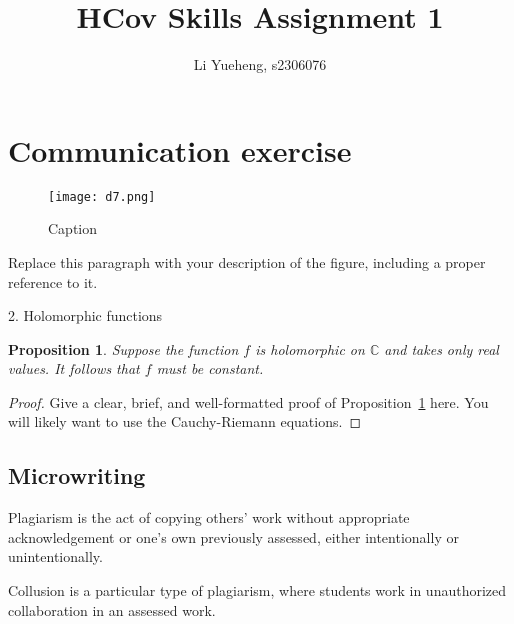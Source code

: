 \documentclass[a4paper,11pt]{article}
\title{HCov Skills Assignment 1}
\author{Li Yueheng, s2306076}
\newtheorem{prop}{Proposition}
\begin{document}
\maketitle



\section{Communication exercise} %

\begin{figure}
    \centering
    \texttt{[image: d7.png]}
    \caption{Caption}
\end{figure}


Replace this paragraph with your description of the figure, including a proper reference to it.


2. Holomorphic functions

\begin{prop}\label{prop:fCtoRconst} %
Suppose the function \( f \) is holomorphic on \( \mathbb{C} \) and takes only real values. It follows that \( f \) must be constant.
\end{prop}

\begin{proof}
Give a clear, brief, and well-formatted proof of Proposition~\ref{prop:fCtoRconst} here. You will likely want to use the Cauchy-Riemann equations.
\end{proof}


\subsection{Microwriting}

Plagiarism is the act of copying others' work without appropriate acknowledgement or one's own previously assessed, either intentionally or unintentionally.

Collusion is a particular type of plagiarism, where students work in unauthorized collaboration in an assessed work.





%
%
%
%
\end{document}
